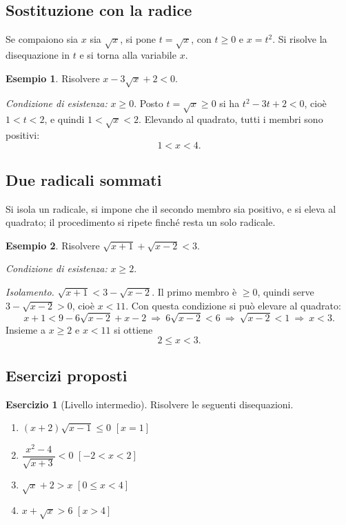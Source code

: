 \documentclass[12pt,a4paper,openany]{book}
\theoremstyle{definition}
\newtheorem{esempio}{Esempio}[section]
\newtheorem{esercizio}{Esercizio}[section]
\theoremstyle{plain}
\theoremstyle{remark}
\begin{document}
\subsection*{Sostituzione con la radice}

Se compaiono sia $x$ sia $\sqrt{x}$, si pone $t=\sqrt{x}$, con $t\ge 0$ e $x=t^2$. Si risolve la disequazione in $t$ e si torna alla variabile $x$.

\begin{esempio}
Risolvere $x-3\sqrt{x}+2<0$.

\emph{Condizione di esistenza:} $x\ge 0$. Posto $t=\sqrt{x}\ge 0$ si ha $t^2-3t+2<0$, cioè $1<t<2$, e quindi $1<\sqrt{x}<2$. Elevando al quadrato, tutti i membri sono positivi:
\[
1<x<4.
\]
\end{esempio}

\subsection*{Due radicali sommati}

Si isola un radicale, si impone che il secondo membro sia positivo, e si eleva al quadrato; il procedimento si ripete finché resta un solo radicale.

\begin{esempio}
Risolvere $\sqrt{x+1}+\sqrt{x-2}<3$.

\emph{Condizione di esistenza:} $x\ge 2$.

\emph{Isolamento.} $\sqrt{x+1}<3-\sqrt{x-2}$. Il primo membro è $\ge 0$, quindi serve $3-\sqrt{x-2}>0$, cioè $x<11$. Con questa condizione si può elevare al quadrato:
\[
x+1<9-6\sqrt{x-2}+x-2\ \Longrightarrow\ 6\sqrt{x-2}<6\ \Longrightarrow\ \sqrt{x-2}<1\ \Longrightarrow\ x<3.
\]
Insieme a $x\ge 2$ e $x<11$ si ottiene
\[
2\le x<3.
\]
\end{esempio}

\subsection*{Esercizi proposti}

\begin{esercizio}[Livello intermedio]
Risolvere le seguenti disequazioni.
\begin{enumerate}[label=\alph*)]
\item $(x+2)\sqrt{x-1}\le 0$ \hfill $[x=1]$
\item $\dfrac{x^2-4}{\sqrt{x+3}}<0$ \hfill $[-2<x<2]$
\item $\sqrt{x}+2>x$ \hfill $[0\le x<4]$
\item $x+\sqrt{x}>6$ \hfill $[x>4]$
\end{enumerate}
\end{esercizio}
\end{document}
